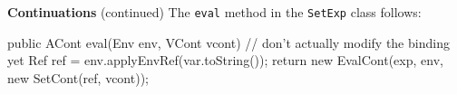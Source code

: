 \begin{minipage}[t]{\sw}
\slidenumber
\LARGE
{\bf Continuations} (continued)\exx
The \verb'eval' method in the \verb'SetExp' class follows:
\Large
\begin{qv}
    public ACont eval(Env env, VCont vcont) {
        // don't actually modify the binding yet
        Ref ref = env.applyEnvRef(var.toString());
        return new EvalCont(exp, env, new SetCont(ref, vcont));
    }
\end{qv}
\end{minipage}
